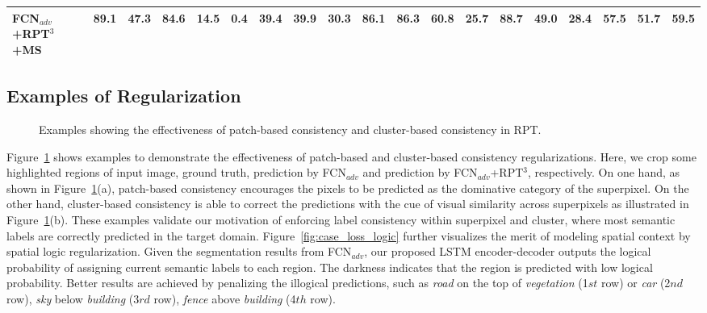 \documentclass[10pt,twocolumn,letterpaper]{article}
\begin{document}
\begin{table*}[]
\begin{tabular}{l@{~}|@{~}c@{~~}c@{~~}c@{~~}c@{~~}c@{~~}c@{~~}c@{~~}c@{~~}c@{~~}c@{~~}c@{~~}c@{~~}c@{~~}c@{~~}c@{~~}c@{~}|@{~}c@{~~}c@{~}}
   \textbf{FCN$_{adv}$+RPT$^{3}$}+MS                               & 89.1          & 47.3          & \textbf{84.6} & 14.5          & 0.4          & 39.4          & 39.9          & 30.3          & 86.1          & \textbf{86.3} & 60.8          & 25.7          & \textbf{88.7} & \textbf{49.0} & \textbf{28.4} & \textbf{57.5} & \textbf{51.7} & \textbf{59.5}\\ \hline
   \end{tabular}
   \vspace{-0.15in}
   \label{tab:SYNTHIA}
\end{table*}
\subsection{Examples of Regularization}
\begin{figure}[!tb]
   \caption{\small Examples showing the effectiveness of patch-based consistency and cluster-based consistency in RPT.}
   \label{fig:case_loss}
   \vspace{-0.15in}
\end{figure}
Figure~\ref{fig:case_loss} shows examples to demonstrate the effectiveness of patch-based and cluster-based consistency regularizations. Here, we crop some highlighted regions of input image, ground truth, prediction by FCN$_{adv}$ and prediction by FCN$_{adv}$+RPT$^{3}$, respectively.
On one hand, as shown in Figure~\ref{fig:case_loss}(a), patch-based consistency encourages the pixels to be predicted as the dominative category of the superpixel. On the other hand, cluster-based consistency is able to correct the predictions with the cue of visual similarity across superpixels as illustrated in Figure~\ref{fig:case_loss}(b).
These examples validate our motivation of enforcing label consistency within superpixel and cluster, where most semantic labels are correctly predicted in the target domain. Figure~\ref{fig:case_loss_logic} further visualizes the merit of modeling spatial context by spatial logic regularization.
Given the segmentation results from FCN$_{adv}$, our proposed LSTM encoder-decoder outputs the logical probability of assigning current semantic labels to each region. The darkness indicates that the region is predicted with low logical probability.
Better results are achieved by penalizing the illogical predictions, such as \textit{road} on the top of \textit{vegetation} (1$st$ row) or \textit{car} (2$nd$ row), \textit{sky} below \textit{building} (3$rd$ row), \textit{fence} above \textit{building} (4$th$ row).
\end{document}
